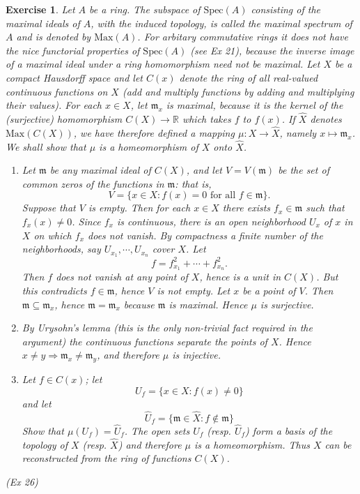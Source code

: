 \documentclass[]{report}
\newtheorem{exercise}[theorem]{Exercise}
\begin{document}
\begin{exercise}
    Let $A$ be a ring. The subspace of $\text{Spec}(A)$ consisting of the maximal ideals of $A$, with the induced topology, is called the maximal spectrum of $A$ and is denoted by $\text{Max}(A)$. For arbitary commutative rings it does not have the nice functorial properties of $\text{Spec}(A)$ (see Ex 21), because the inverse image of a maximal ideal under a ring homomorphism need not be maximal.
    Let $X$ be a compact Hausdorff space and let $C(x)$ denote the ring of all real-valued continuous functions on $X$ (add and multiply functions by adding and multiplying their values). For each $x\in X$, let $\mathfrak{m}_x$ is maximal, because it is the kernel of the (surjective) homomorphism $C(X) \rightarrow \mathbb{R}$ which takes $f$ to $f(x)$. If $\hat{X}$ denotes $\text{Max}(C(X))$, we have therefore defined a mapping $\mu: X\rightarrow \hat{X}$, namely $x\mapsto \mathfrak{m}_x$. 
    We shall show that $\mu$ is a homeomorphism of $X$ onto $\hat{X}$. 
    \begin{enumerate}
        \item Let $\mathfrak{m}$ be any maximal ideal of $C(X)$, and let $V = V(\mathfrak{m})$ be the set of common zeros of the functions in $\mathfrak{m}$: that is,
            $$V =\{x \in X: f(x) = 0 \text{ for all } f\in \mathfrak{m}\}.$$
            Suppose that $V$ is empty. Then for each $x\in X$ there exists $f_x \in \mathfrak{m}$ such that $f_x(x) \neq 0$. Since $f_x$ is continuous, there is an open neighborhood $U_x$ of $x$ in $X$ on which $f_x$ does not vanish. By compactness a finite number of the neighborhoods, say $U_{x_1},\cdots,U_{x_n}$ cover $X$. Let
            $$f = f^2_{x_1} + \cdots + f^2_{x_n}.$$
            Then $f$ does not vanish at any point of $X$, hence is a unit in $C(X)$. But this contradicts $f\in \mathfrak{m}$, hence $V$ is not empty.
            Let $x$ be a point of $V$. Then $\mathfrak{m} \subseteq \mathfrak{m}_x$, hence $\mathfrak{m} = \mathfrak{m}_x$ because $\mathfrak{m}$ is maximal. Hence $\mu$ is surjective.
        \item By Urysohn's lemma (this is the only non-trivial fact required in the argument) the continuous functions separate the points of $X$. Hence $x\neq y \Rightarrow \mathfrak{m}_x \neq \mathfrak{m}_y$, and therefore $\mu$ is injective. 
        \item Let $f\in C(x)$; let
            $$U_f = \{x\in X:f(x) \neq 0\}$$
            and let
            $$\hat{U}_f = \{\mathfrak{m} \in \hat{X}: f\not\in \mathfrak{m}\}$$
            Show that $\mu(U_f) = \hat{U}_f$. The open sets $U_f$ (resp. $\hat{U}_f$) form a basis of the topology of $X$ (resp. $\hat{X}$) and therefore $\mu$ is a homeomorphism.
            Thus $X$ can be reconstructed from the ring of functions $C(X)$. 
    \end{enumerate}
    (Ex 26)
\end{exercise}
\end{document}
